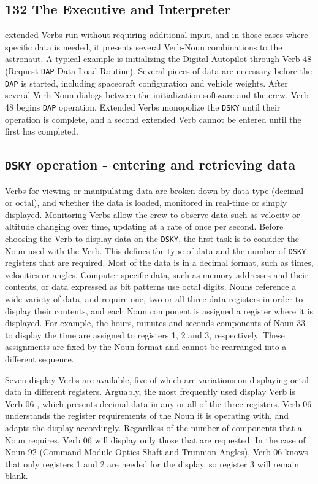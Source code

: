 \documentclass[refcap, oxford]{ahsan}
\begin{document}
\subsection{132 The Executive and Interpreter}
extended Verbs run without requiring additional input, and in those cases where specific data is needed, it presents several Verb-Noun combinations to the astronaut. A typical example is initializing the Digital Autopilot through Verb 48 (Request \texttt{DAP} Data Load Routine). Several pieces of data are necessary before the \texttt{DAP} is started, including spacecraft configuration and vehicle weights. After several Verb-Noun dialogs between the initialization software and the crew, Verb 48 begins \texttt{DAP} operation. Extended Verbs monopolize the \texttt{DSKY} until their operation is complete, and a second extended Verb cannot be entered until the first has completed.


\subsection{\texttt{DSKY} operation - entering and retrieving data}
Verbs for viewing or manipulating data are broken down by data type (decimal or octal), and whether the data is loaded, monitored in real-time or simply displayed. Monitoring Verbs allow the crew to observe data such as velocity or altitude changing over time, updating at a rate of once per second. Before choosing the Verb to display data on the \texttt{DSKY}, the first task is to consider the Noun used with the Verb. This defines the type of data and the number of \texttt{DSKY} registers that are required. Most of the data is in a decimal format, such as times, velocities or angles. Computer-specific data, such as memory addresses and their contents, or data expressed as bit patterns use octal digits. Nouns reference a wide variety of data, and require one, two or all three data registers in order to display their contents, and each Noun component is assigned a register where it is displayed. For example, the hours, minutes and seconds components of Noun 33 to display the time are assigned to registers 1, 2 and 3, respectively. These assignments are fixed by the Noun format and cannot be rearranged into a different sequence.

Seven display Verbs are available, five of which are variations on displaying octal data in different registers. Arguably, the most frequently used display Verb is Verb 06 , which presents decimal data in any or all of the three registers. Verb 06 understands the register requirements of the Noun it is operating with, and adapts the display accordingly. Regardless of the number of components that a Noun requires, Verb 06 will display only those that are requested. In the case of Noun 92 (Command Module Optics Shaft and Trunnion Angles), Verb 06 knows that only registers 1 and 2 are needed for the display, so register 3 will remain blank.
\end{document}
